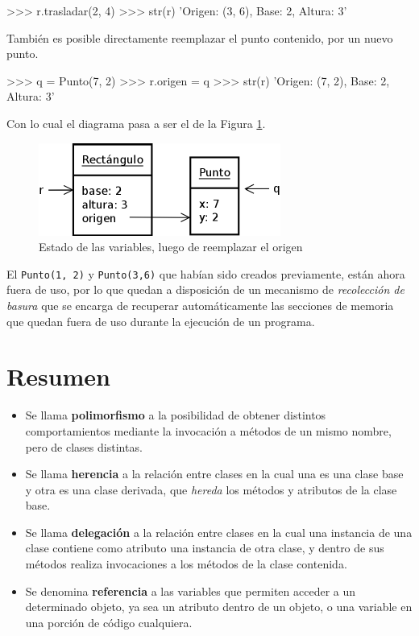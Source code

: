 \begin{codigo-python-sn}
>>> r.trasladar(2, 4)
>>> str(r)
'Origen: (3, 6), Base: 2, Altura: 3'
\end{codigo-python-sn}

También es posible directamente reemplazar el punto contenido, por un nuevo
punto.

\begin{codigo-python-sn}
>>> q = Punto(7, 2)
>>> r.origen = q
>>> str(r)
'Origen: (7, 2), Base: 2, Altura: 3'
\end{codigo-python-sn}

Con lo cual el diagrama pasa a ser el de la Figura
\ref{rectangulo_punto_b}.

\begin{figure}[htb]
\includegraphics{graficos/15_Rectangulo_Punto_b}
\caption{Estado de las variables, luego de reemplazar el origen}
\label{rectangulo_punto_b}
\end{figure}

\begin{observacion}
El \lstinline!Punto(1, 2)! y \lstinline!Punto(3,6)! que habían sido creados
previamente, están ahora fuera de uso, por lo que quedan a disposición de un
mecanismo de \emph{recolección de basura} que se encarga de recuperar
automáticamente las secciones de memoria que quedan fuera de uso durante la
ejecución de un programa.
\end{observacion}

\section{Resumen}

\begin{itemize}
\item Se llama {\bf polimorfismo} a la posibilidad de obtener distintos
comportamientos mediante la invocación a métodos de un mismo nombre, pero de
clases distintas.

\item Se llama {\bf herencia} a la relación entre clases en la cual una es una
clase base y otra es una clase derivada, que \emph{hereda} los métodos y
atributos de la clase base.

\item Se llama {\bf delegación} a la relación entre clases en la cual una
instancia de una clase contiene como atributo una instancia de otra clase,
y dentro de sus métodos realiza invocaciones a los métodos de la clase
contenida.

\item Se denomina {\bf referencia} a las variables que permiten acceder a
un determinado objeto, ya sea un atributo dentro de un objeto, o una
variable en una porción de código cualquiera.
\end{itemize}


